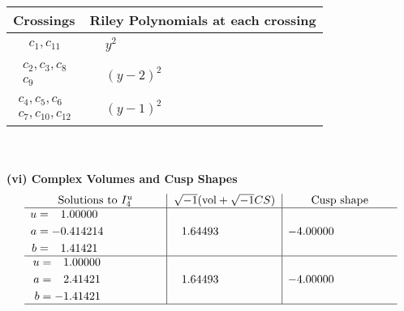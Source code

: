 \documentclass[1p]{elsarticle_modified}
\theoremstyle{definition}
\newcommand{\I}{\sqrt{-1}}
\begin{document}
\begin{tabular}{m{50pt}|m{274pt}}
Crossings & \hspace{64pt}Riley Polynomials at each crossing \\
\hline $$\begin{aligned}c_{1},c_{11}\end{aligned}$$&$\begin{aligned}
&y^2
\end{aligned}$\\
\hline $$\begin{aligned}c_{2},c_{3},c_{8}\\c_{9}\end{aligned}$$&$\begin{aligned}
&(y-2)^2
\end{aligned}$\\
\hline $$\begin{aligned}c_{4},c_{5},c_{6}\\c_{7},c_{10},c_{12}\end{aligned}$$&$\begin{aligned}
&(y-1)^2
\end{aligned}$\\
\hline
\end{tabular}\\~\\
\newpage\flushleft \textbf{(vi) Complex Volumes and Cusp Shapes}
$$\begin{array}{c|c|c}  
\text{Solutions to }I^u_{4}& \I (\text{vol} + \sqrt{-1}CS) & \text{Cusp shape}\\
 \hline 
\begin{aligned}
u &= \phantom{-}1.00000\phantom{ +0.000000I} \\
a &= -0.414214\phantom{ +0.000000I} \\
b &= \phantom{-}1.41421\phantom{ +0.000000I}\end{aligned}
 & \phantom{-}1.64493\phantom{ +0.000000I} & -4.00000\phantom{ +0.000000I} \\ \hline\begin{aligned}
u &= \phantom{-}1.00000\phantom{ +0.000000I} \\
a &= \phantom{-}2.41421\phantom{ +0.000000I} \\
b &= -1.41421\phantom{ +0.000000I}\end{aligned}
 & \phantom{-}1.64493\phantom{ +0.000000I} & -4.00000\phantom{ +0.000000I}\\
 \hline 
 \end{array}$$\newpage
\newpage\renewcommand{\arraystretch}{1}
\end{document}
